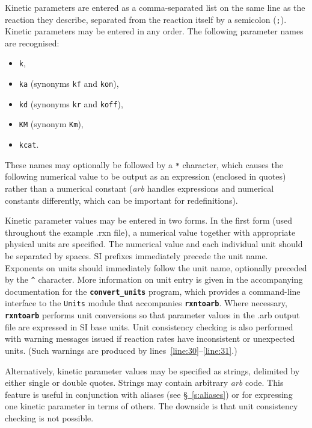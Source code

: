 \documentclass[fontsize=12pt,
               captions=abovetable,
               numbers=noenddot,
              ]{scrartcl}
\newcommand{\sect}[1]{\hyperref[s:#1]{\S~\ref{s:#1}}}
\newcommand{\rxntoarb}{\texttt{\textbf{rxntoarb}}}
\newcommand{\convertunits}{\texttt{\textbf{convert\_units}}}
\newcommand{\syntax}[2]{\textcolor{#1}{\texttt{#2}}}
\newcommand{\lnums}[2]{lines~\ref{line:#1}--\ref{line:#2}}
\begin{document}
Kinetic parameters are entered as a comma-separated list on the same line as the reaction they describe, separated from the reaction itself by a semicolon (\syntax{statement}{;}). Kinetic parameters may be entered in any order. The following parameter names are recognised:
\begin{itemize}
\item \syntax{function}{k},
\item \syntax{function}{ka} (synonyms \syntax{function}{kf} and \syntax{function}{kon}),
\item \syntax{function}{kd} (synonyms \syntax{function}{kr} and \syntax{function}{koff}),
\item \syntax{function}{KM} (synonym \syntax{function}{Km}),
\item \syntax{function}{kcat}.
\end{itemize}
These names may optionally be followed by a \syntax{function}{*} character, which causes the following numerical value to be output as an expression (enclosed in quotes) rather than a numerical constant (\emph{arb} handles expressions and numerical constants differently, which can be important for redefinitions).

Kinetic parameter values may be entered in two forms. In the first form (used throughout the example .rxn file), a numerical value together with appropriate physical units are specified. The numerical value and each individual unit should be separated by spaces. SI prefixes immediately precede the unit name. Exponents on units should immediately follow the unit name, optionally preceded by the \syntax{string}{\^} character. More information on unit entry is given in the accompanying documentation for the \convertunits{} program, which provides a command-line interface to the \texttt{Units} module that accompanies \rxntoarb. Where necessary, \rxntoarb{} performs unit conversions so that parameter values in the .arb output file are expressed in SI base units. Unit consistency checking is also performed with warning messages issued if reaction rates have inconsistent or unexpected units. (Such warnings are produced by \lnums{30}{31}.)

Alternatively, kinetic parameter values may be specified as strings, delimited by either single or double quotes. Strings may contain arbitrary \emph{arb} code. This feature is useful in conjunction with aliases (see \sect{aliases}) or for expressing one kinetic parameter in terms of others. The downside is that unit consistency checking is not possible.
\end{document}
